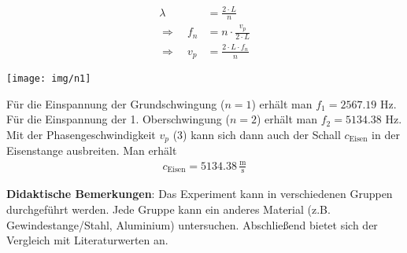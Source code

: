 \documentclass[../main.tex]{subfiles}
\begin{document}
\begin{tcolorbox}
    \vspace{-3.3cm}
    \hspace{-0.7cm}
    \begin{minipage}[]{0.35\textwidth}
        \vspace{-0.5cm}
        \begin{align}
            \lambda &= \frac{2 \cdot L}{n} \\
            \Rightarrow \quad f_n &= n \cdot \frac{v_p}{2\cdot  L}\\[5pt]
            \Rightarrow \quad v_p &= \frac{2\cdot L \cdot f_n}{n}
        \end{align}
    \end{minipage}
    \hspace{0.2cm}
    \begin{minipage}[]{0.6\textwidth}
        \def\svgwidth{220pt}
        
    \end{minipage}

    \vspace{-3.2cm}
    \begin{minipage}[]{0.35\textwidth} 
        \texttt{[image: img/n1]}
    \end{minipage}
    \hspace{0.4cm}
    \begin{minipage}[]{0.6\textwidth}
        Für die Einspannung der Grundschwingung ($n=1$) erhält man $f_1=2567.19$ Hz.\\
        Für die Einspannung der 1. Oberschwingung ($n=2$) erhält man $f_2=5134.38$ Hz.\\
        Mit der Phasengeschwindigkeit $v_p$ (3) kann sich dann auch der Schall $c_{\text{Eisen}}$ in der Eisenstange ausbreiten. Man erhält
        \begin{align*}
            c_{\text{Eisen}} = 5134.38 \, \frac{\text{m}}{\text{s}} 
        \end{align*}
    
        \vspace{0.4cm}
    \textbf{Didaktische Bemerkungen}: Das Experiment kann in verschiedenen Gruppen durchgeführt werden. Jede Gruppe kann ein anderes Material (z.B. Gewindestange/Stahl, Aluminium) untersuchen. Abschließend bietet sich der Vergleich mit Literaturwerten an. 
    \end{minipage}

\end{tcolorbox}
\end{document}
